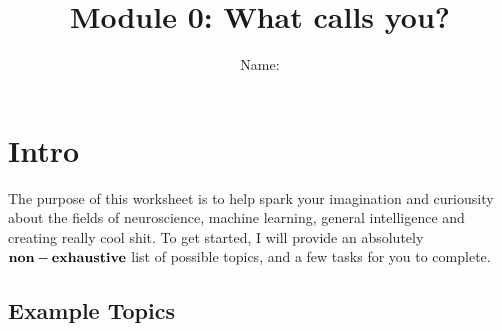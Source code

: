 \documentclass[letterpaper,11pt]{article}
\begin{document}
\title{{\bf Module 0: What calls you?} }
\author{Name: }

\date{}
\maketitle

\section{Intro}
The purpose of this worksheet is to help spark your imagination and curiousity about the fields of neuroscience, machine learning, general intelligence and creating really cool shit. To get started, I will provide an absolutely $\bf{non-exhaustive}$ list of possible topics, and a few tasks for you to complete.

\subsection{Example Topics}
\end{document}
